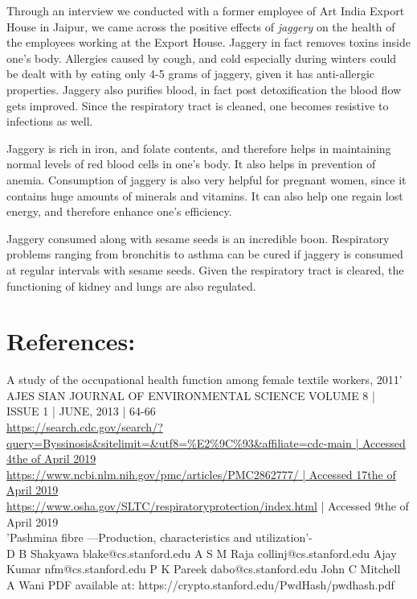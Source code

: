 \documentclass[journal]{IEEEtran}
\begin{document}
\par
Through an interview we conducted with a former employee of Art India Export House in Jaipur, we came across the positive effects of \textit{jaggery} on the health of the employees working at the Export House. Jaggery in fact removes toxins inside one's body. Allergies caused by cough, and cold especially during winters could be dealt with by eating only 4-5 grams of jaggery, given it has anti-allergic properties. Jaggery also purifies blood, in fact post detoxification the blood flow gets improved. Since the respiratory tract is cleaned, one becomes resistive to infections as well. 

\par
Jaggery is rich in iron, and folate contents, and therefore helps in maintaining normal levels of red blood cells in one's body. It also helps in prevention of anemia. Consumption of jaggery is also very helpful for pregnant women, since it contains huge amounts of minerals and vitamins. It can also help one regain lost energy, and therefore enhance one's efficiency.  

\par
Jaggery consumed along with sesame seeds is an incredible boon. Respiratory problems ranging from bronchitis to asthma can be cured if jaggery is consumed at regular intervals with sesame seeds. Given the respiratory tract is cleared, the functioning of kidney and lungs are also regulated.


\section{References:}

A study of the occupational health function among female textile workers, 2011' \\
AJES SIAN JOURNAL OF ENVIRONMENTAL SCIENCE VOLUME 8 | ISSUE 1 | JUNE, 2013 | 64-66\\

 \url{https://search.cdc.gov/search/?query=Byssinosis&sitelimit=&utf8=%E2%9C%93&affiliate=cdc-main | Accessed 4the of April 2019}\\
 
 \url{https://www.ncbi.nlm.nih.gov/pmc/articles/PMC2862777/ | Accessed 17the of April 2019}\\
 
 \url{https://www.osha.gov/SLTC/respiratoryprotection/index.html} | Accessed 9the of April 2019\\


'Pashmina fibre —Production, characteristics and utilization'-\\
D B Shakyawa
blake@cs.stanford.edu
 A S M Raja
collinj@cs.stanford.edu
Ajay Kumar
nfm@cs.stanford.edu
P K Pareek
dabo@cs.stanford.edu
John C Mitchell
A Wani
PDF available at: https://crypto.stanford.edu/PwdHash/pwdhash.pdf \\
\end{document}
